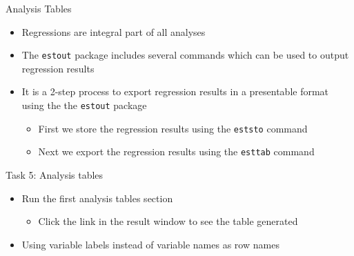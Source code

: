 \documentclass[aspectratio=169]{beamer}
\begin{document}
\begin{frame}{Analysis Tables}
	\begin{itemize}
		\item Regressions are integral part of all analyses
		\item The \texttt{estout} package includes several commands which can be used to output regression results
		\item It is a 2-step process to export regression results in a presentable format using the the \texttt{estout} package
		\begin{itemize}
			\item First we store the regression results using the \texttt{eststo} command
			\item Next we export the regression results  using the \texttt{esttab} command
		\end{itemize}
	\end{itemize}
\end{frame}


\begin{frame}{Task 5: Analysis tables}
	\begin{itemize}
		\item Run the first analysis tables section
		\begin{itemize}
			\item Click the link in the result window to see the table generated
		\end{itemize}
		\item Using variable labels instead of variable names as row names
	\end{itemize}
\color{red}{If we need to fill time we can add more exercises playing around with esttab options}
\end{frame}
\end{document}
